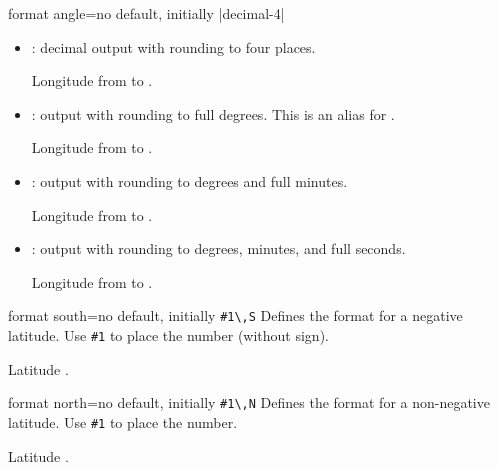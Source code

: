 \begin{docMrcKey}{format angle}{=}{no default, initially |decimal-4|}
\begin{itemize}
    \begin{dispExample}
      Longitude from  to .
    \end{dispExample}
  \item{}: decimal output with rounding to four places.
    \begin{dispExample}
      Longitude from  to .
    \end{dispExample}
  \item{}: output with rounding to full degrees.
      This is an alias for .
    \begin{dispExample}
      Longitude from  to .
    \end{dispExample}
  \item{}: output with rounding to degrees and full minutes.
    \begin{dispExample}
      Longitude from  to .
    \end{dispExample}
  \item{}: output with rounding to degrees, minutes, and full seconds.
    \begin{dispExample}
      Longitude from  to .
    \end{dispExample}
  \end{itemize}
\end{docMrcKey}


\begin{docMrcKey}{format south}{=}{no default, initially \texttt{\#1\textbackslash,S}}
  Defines the format  for a negative latitude.
  Use \texttt{\#1} to place the number (without sign).
  \begin{dispExample}
    Latitude .
  \end{dispExample}
\end{docMrcKey}

\begin{docMrcKey}{format north}{=}{no default, initially \texttt{\#1\textbackslash,N}}
  Defines the format  for a non-negative latitude.
  Use \texttt{\#1} to place the number.
  \begin{dispExample}
    Latitude .
  \end{dispExample}
\end{docMrcKey}

